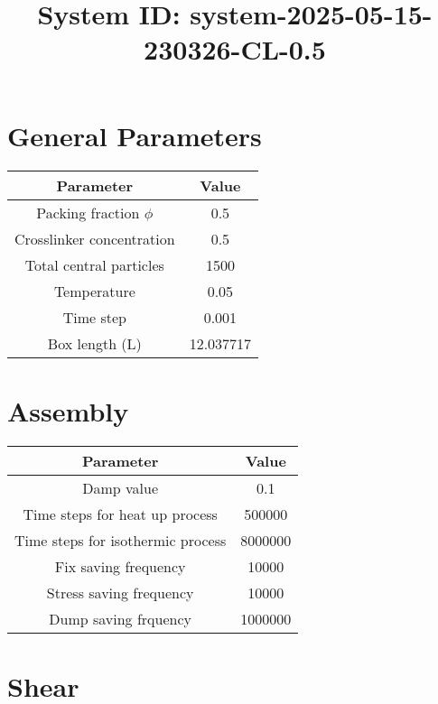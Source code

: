 \documentclass{tareaClass}
\title{ System ID: system-2025-05-15-230326-CL-0.5 }
\begin{document}
\rhead{ \today }

\maketitle

\section{General Parameters}

\begin{table}[ht!]
\centering
\begin{tabular}{|c|c|} 
\hline
Parameter & Value  \\ 
  \hline
    Packing fraction $\phi$ & 0.5 \\
    Crosslinker concentration & 0.5 \\
    Total central particles & 1500 \\
    Temperature & 0.05 \\
    Time step & 0.001 \\
    Box length (L) & 12.037717 \\
  \hline
\end{tabular}
\end{table}



\section{Assembly}

\begin{table}[ht!]
\centering
\begin{tabular}{|c|c|} 
\hline
Parameter & Value  \\ 
  \hline
    Damp value & 0.1 \\
    Time steps for heat up process & 500000 \\
    Time steps for isothermic process & 8000000 \\
    Fix saving frequency  & 10000 \\
    Stress saving frequency & 10000 \\
    Dump saving frquency  & 1000000 \\
  \hline
\end{tabular}
\end{table}

\section{Shear}
\end{document}
